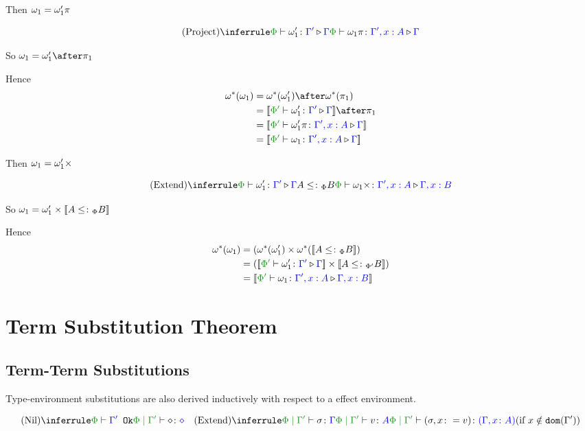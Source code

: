 \documentclass{report}
\begin{document}
Then $\omega_1 = \omega_1'\pi$

\begin{equation}
    \ntreeruleI{Project}{\ewrel{\P}{\w_1'}{\G'}{\G}}{\ewrel{\P}{\w_1\pi}{\G',x:A}{\G}}
\end{equation}

So $\w_1 = \w_1'\after\p$

Hence
\begin{align*}
    \w\star(\w_1) &= \w\star(\w_1')\after\w\star(\p)\\
    & = \deno{\ewrel{\P'}{\w_1'}{\G'}{\G}}\after\p\\
    & = \deno{\ewrel{\P'}{\w_1'\pi}{\G',x:A}{\G}}\\
    & = \deno{\ewrel{\P'}{\w_1}{\G', x:A}{\G}}
\end{align*}

Then $\omega_1 = \omega_1'\times$

\begin{equation}
    \ntreeruleII{Extend}{\ewrel{\P}{\w_1'}{\G'}{\G}}{ A\subtypep B}{\ewrel{\P}{\w_1\x}{\G',x:A}{\G, x:B}}
\end{equation}

So $\omega_1 = \omega_1'\times{\bf [\![}A\leq\colon_\Phi B{\bf ]\!]}$

Hence
\begin{align*}
    \w\star(\w_1) &=(\w\star(\w_1')\times\w\star(\deno{A\subtypep B})\\
    & = (\deno{\ewrel{\P'}{\w_1'}{\G'}{\G}}\times\deno{A\subtypepp B})\\
    & = \deno{\ewrel{\P'}{\w_1}{\G',x:A}{\G,x:B}}
\end{align*}

\chapter{Term Substitution Theorem}

\section{Term-Term Substitutions}
Type-environment substitutions are also derived inductively with respect to a effect environment.


\[
    \ntreeruleI{Nil}{\wellformedok{\P}{\G'}}{\etyperelation{\P}{\G'}{\nil}{\nil}}
    \quad
    \condtreeruleII{Extend}{
        \etyperelation{\P}{\G'}{\si}{\G}
    }{
        \etyperelation{\P}{\G'}{v}{A}
    }{
        \etyperelation{\P}{\G'}{(\si, x \setto v)}{(\gax)}
    }{x \notin \dom{\G'}}
\]
\end{document}
